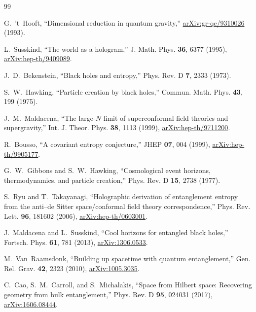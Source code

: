 \documentclass[aps,prd,twocolumn,superscriptaddress,nofootinbib]{revtex4-2}
\begin{document}
\begin{thebibliography}{99}

 G.~'t~Hooft, ``Dimensional reduction in quantum gravity,'' \href{https://arxiv.org/abs/gr-qc/9310026}{arXiv:gr-qc/9310026} (1993).

 L.~Susskind, ``The world as a hologram,'' J. Math. Phys. \textbf{36}, 6377 (1995), \href{https://arxiv.org/abs/hep-th/9409089}{arXiv:hep-th/9409089}.

 J.~D.~Bekenstein, ``Black holes and entropy,'' Phys. Rev. D \textbf{7}, 2333 (1973).

 S.~W.~Hawking, ``Particle creation by black holes,'' Commun. Math. Phys. \textbf{43}, 199 (1975).

 J.~M.~Maldacena, ``The large-$N$ limit of superconformal field theories and supergravity,'' Int. J. Theor. Phys. \textbf{38}, 1113 (1999), \href{https://arxiv.org/abs/hep-th/9711200}{arXiv:hep-th/9711200}.

 R.~Bousso, ``A covariant entropy conjecture,'' JHEP \textbf{07}, 004 (1999), \href{https://arxiv.org/abs/hep-th/9905177}{arXiv:hep-th/9905177}.

 G.~W.~Gibbons and S.~W.~Hawking, ``Cosmological event horizons, thermodynamics, and particle creation,'' Phys. Rev. D \textbf{15}, 2738 (1977).

 S.~Ryu and T.~Takayanagi, ``Holographic derivation of entanglement entropy from the anti--de Sitter space/conformal field theory correspondence,'' Phys. Rev. Lett. \textbf{96}, 181602 (2006), \href{https://arxiv.org/abs/hep-th/0603001}{arXiv:hep-th/0603001}.

 J.~Maldacena and L.~Susskind, ``Cool horizons for entangled black holes,'' Fortsch. Phys. \textbf{61}, 781 (2013), \href{https://arxiv.org/abs/1306.0533}{arXiv:1306.0533}.

 M.~Van~Raamsdonk, ``Building up spacetime with quantum entanglement,'' Gen. Rel. Grav. \textbf{42}, 2323 (2010), \href{https://arxiv.org/abs/1005.3035}{arXiv:1005.3035}.

 C.~Cao, S.~M.~Carroll, and S.~Michalakis, ``Space from Hilbert space: Recovering geometry from bulk entanglement,'' Phys. Rev. D \textbf{95}, 024031 (2017), \href{https://arxiv.org/abs/1606.08444}{arXiv:1606.08444}.


\end{thebibliography}
\end{document}
